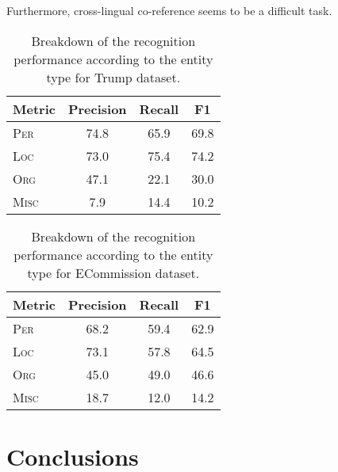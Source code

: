 \documentclass[11pt]{article}
\begin{document}
Furthermore, cross-lingual co-reference seems to be a difficult task.


\begin{table}
  \begin{center}
    \begin{footnotesize}
      \begin{tabular}{lccc}
        \toprule 
        Metric & \textbf{Precision} & \textbf{Recall} & \textbf{F1} \\
        \midrule
	\textsc{Per} & 74.8 & 65.9 & 69.8 \\
	\textsc{Loc} & 73.0 & 75.4 & 74.2 \\
	\textsc{Org} & 47.1 & 22.1 & 30.0 \\
	\textsc{Misc} & 7.9 & 14.4 & 10.2 \\
        \bottomrule
      \end{tabular}
    \end{footnotesize}
  \end{center}
  \caption{Breakdown of the recognition performance according to the entity type for {\sc Trump} dataset.}
  \label{tab:recognition-breakdown-trump}
\end{table}

\begin{table}
  \begin{center}
    \begin{footnotesize}
      \begin{tabular}{lccc}
        \toprule 
        Metric & \textbf{Precision} & \textbf{Recall} & \textbf{F1} \\
        \midrule
	\textsc{Per} & 68.2 & 59.4 & 62.9 \\
	\textsc{Loc} & 73.1 & 57.8 & 64.5 \\
	\textsc{Org} & 45.0 & 49.0 & 46.6 \\
	\textsc{Misc} & 18.7 & 12.0 & 14.2 \\
        \bottomrule
      \end{tabular}
    \end{footnotesize}
  \end{center}
  \caption{Breakdown of the recognition performance according to the entity type for {\sc ECommission} dataset.}
  \label{tab:recognition-breakdown-ec}
\end{table}

\section{Conclusions}
\label{sec:conclusions}
\end{document}
